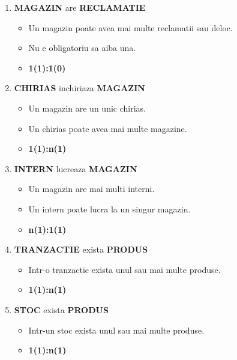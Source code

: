 \begin{enumerate}
    \vspace{0.5cm}

    \item \textbf{MAGAZIN} are \textbf{RECLAMATIE}
    \begin{itemize}
        \item Un magazin poate avea mai multe reclamatii sau deloc.
        \item Nu e obligatoriu sa aiba una. 
        \item \textbf{1(1):1(0)}
    \end{itemize}

    \vspace{0.5cm}

    \item \textbf{CHIRIAS} inchiriaza \textbf{MAGAZIN}
    \begin{itemize}
        \item Un magazin are un unic chirias.
        \item Un chirias poate avea mai multe magazine. 
        \item \textbf{1(1):n(1)}
    \end{itemize}

    \vspace{0.5cm}

    \item \textbf{INTERN} lucreaza \textbf{MAGAZIN}
    \begin{itemize}
        \item Un magazin are mai multi interni.
        \item Un intern poate lucra la un singur magazin. 
        \item \textbf{n(1):1(1)}
    \end{itemize}

    \vspace{0.5cm}

    \item \textbf{TRANZACTIE} exista \textbf{PRODUS}
    \begin{itemize}
        \item Intr-o tranzactie exista unul sau mai multe produse.
        \item \textbf{1(1):n(1)}
    \end{itemize}

    \vspace{0.5cm}

    \item \textbf{STOC} exista \textbf{PRODUS}
    \begin{itemize}
        \item Intr-un stoc exista unul sau mai multe produse.
        \item \textbf{1(1):n(1)}
    \end{itemize}


\end{enumerate}

